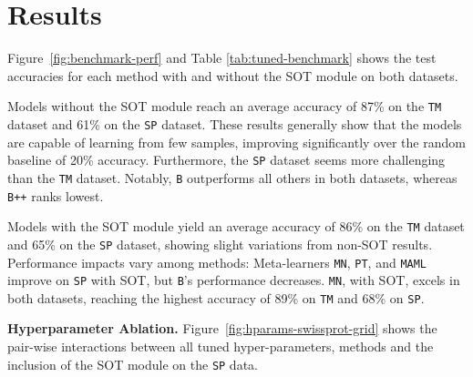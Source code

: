 \section{Results}


Figure~\ref{fig:benchmark-perf} and Table \ref{tab:tuned-benchmark} shows the test accuracies for each method with and without the SOT module on both datasets.

Models without the SOT module reach an average accuracy of 87\% on the \texttt{TM} dataset and 61\% on the \texttt{SP} dataset. These results generally show that the models are capable of learning from few samples, improving significantly over the random baseline of 20\% accuracy. Furthermore, the \texttt{SP} dataset seems more challenging than the \texttt{TM} dataset. Notably, \texttt{B} outperforms all others in both datasets, whereas \texttt{B++} ranks lowest.

Models with the SOT module yield an average accuracy of 86\% on the \texttt{TM} dataset and 65\% on the \texttt{SP} dataset, showing slight variations from non-SOT results. Performance impacts vary among methods: Meta-learners \texttt{MN}, \texttt{PT}, and \texttt{MAML} improve on \texttt{SP} with SOT, but \texttt{B}'s performance decreases. \texttt{MN}, with SOT, excels in both datasets, reaching the highest accuracy of 89\% on \texttt{TM} and 68\% on \texttt{SP}.

\textbf{Hyperparameter Ablation.} Figure~\ref{fig:hparams-swissprot-grid} shows the pair-wise interactions between all tuned hyper-parameters, methods and the inclusion of the SOT module on the \texttt{SP} data.


